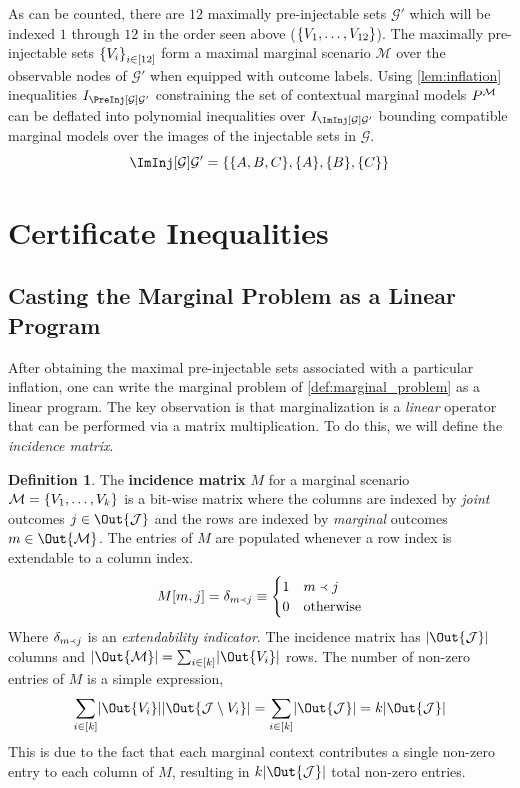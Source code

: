 \documentclass[aps, 10pt, english, twoside, pra, nofootinbib, longbibliography]{revtex4-1}
\theoremstyle{plain}
\theoremstyle{definition}
\newtheorem{definition}[theorem]{Definition}
\theoremstyle{remark}
\newcommand{\graph}{\mathcal{G}}
\newcommand{\ext}{\mathrel{\Yleft}}
\newcommand{\mscenario}{\mathcal{M}}
\newcommand{\jointvar}{\mathcal{J}}
\newcommand{\ts}{{\graph}}
\newcommand{\term}[1]{\textcolor{Mahogany}{\textbf{#1}}}
\begin{document}
    As can be counted, there are $12$ maximally pre-injectable sets $\ts'$ which will be indexed $1$ through $12$ in the order seen above ($\bc{V_1, \ldots, V_{12}}$). The maximally pre-injectable sets $\bc{V_i}_{i \in \bs{12}}$ form a maximal marginal scenario $\mscenario$ over the observable nodes of $\ts'$ when equipped with outcome labels. Using \cref{lem:inflation} inequalities $I_{\PreInj[\ts]{\ts'}}$ constraining the set of contextual marginal models $\prob^{\mscenario}$ can be deflated into polynomial inequalities over $I_{\ImInj[\ts]{\ts'}}$ bounding compatible marginal models over the images of the injectable sets in $\ts$.
    \[ \ImInj[\ts]{\ts'} = \bc{\bc{A, B, C}, \bc{A}, \bc{B}, \bc{C}} \]

    \section{Certificate Inequalities}
    \label{sec:certificate_inequalities}
    \subsection{Casting the Marginal Problem as a Linear Program}
    After obtaining the maximal pre-injectable sets associated with a particular inflation, one can write the marginal problem of \cref{def:marginal_problem} as a linear program. The key observation is that marginalization is a \textit{linear} operator that can be performed via a matrix multiplication. To do this, we will define the \textit{incidence matrix}.
    \begin{definition}
        The \term{incidence matrix} $M$ for a marginal scenario $\mscenario = \bc{V_1, \dots, V_k}$ is a bit-wise matrix where the columns are indexed by \textit{joint} outcomes $j \in \Out{\jointvar}$ and the rows are indexed by \textit{marginal} outcomes $m \in \Out{\mscenario}$. The entries of $M$ are populated whenever a row index is extendable to a column index.
        \[ M\bs{m, j} = \de_{m \ext j} \defined \begin{cases}
            1 & m \ext j \\
            0 & \text{otherwise}
        \end{cases} \]
        Where $\de_{m \ext j}$ is an \textit{extendability indicator}. The incidence matrix has $\abs{\Out{\jointvar}}$ columns and $\abs{\Out{\mscenario}} = \sum_{i\in \bs{k}} \abs{\Out{V_i}}$ rows. The number of non-zero entries of $M$ is a simple expression,
        \[ \sum_{i\in\bs{k}} \abs{\Out{V_i}}\abs{\Out{\jointvar \setminus V_i}} = \sum_{i\in \bs{k}} \abs{\Out{\jointvar}} = k\abs{\Out{\jointvar}} \]
        This is due to the fact that each marginal context contributes a single non-zero entry to each column of $M$, resulting in $k\abs{\Out{\jointvar}}$ total non-zero entries.
    \end{definition}
\end{document}
